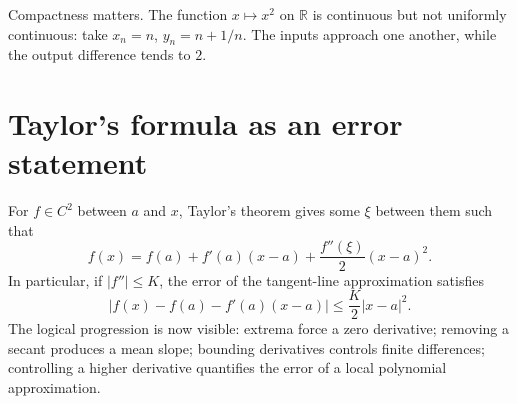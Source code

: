 Compactness matters. The function \(x\mapsto x^2\) on \(\mathbb R\) is continuous but not uniformly continuous: take \(x_n=n\), \(y_n=n+1/n\). The inputs approach one another, while the output difference tends to \(2\).

\section{Taylor's formula as an error statement}

For \(f\in C^2\) between \(a\) and \(x\), Taylor's theorem gives some \(\xi\) between them such that
\[
  f(x)=f(a)+f'(a)(x-a)+\frac{f''(\xi)}2(x-a)^2.
\]
In particular, if \(|f''|\le K\), the error of the tangent-line approximation satisfies
\[
  |f(x)-f(a)-f'(a)(x-a)|\le \frac K2|x-a|^2.
\]
The logical progression is now visible: extrema force a zero derivative; removing a secant produces a mean slope; bounding derivatives controls finite differences; controlling a higher derivative quantifies the error of a local polynomial approximation.
